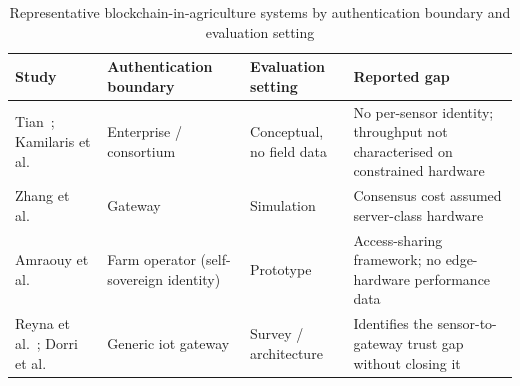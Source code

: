 \documentclass[12pt,a4paper,oneside]{book}
\begin{document}
\begin{table}[htbp]
\centering
\caption{Representative blockchain-in-agriculture systems by authentication
         boundary and evaluation setting}
\label{tab:lit-blockchain-ag}
\footnotesize
\begin{tabularx}{\textwidth}{@{}p{}p{}p{}X@{}}
\toprule
\textbf{Study} & \textbf{Authentication boundary} & \textbf{Evaluation setting} & \textbf{Reported gap} \\
\midrule
Tian~\cite{tian2016agri}; Kamilaris et al.~\cite{kamilaris2019rise}
  & Enterprise / consortium & Conceptual, no field data
  & No per-sensor identity; throughput not characterised on constrained hardware \\
\midrule
Zhang et al.~\cite{zhang2019blockchain}
  & Gateway & Simulation
  & Consensus cost assumed server-class hardware \\
\midrule
Amraouy et al.~\cite{amraouy2025ssi}
  & Farm operator (self-sovereign identity)
  & Prototype
  & Access-sharing framework; no edge-hardware performance data \\
\midrule
Reyna et al.~\cite{reyna2018blockchain}; Dorri et al.~\cite{dorri2017blockchain}
  & Generic \gls{iot} gateway & Survey / architecture
  & Identifies the sensor-to-gateway trust gap without closing it \\
\bottomrule
\end{tabularx}
\end{table}

\label{subsec:lit_consensus}
\end{document}
